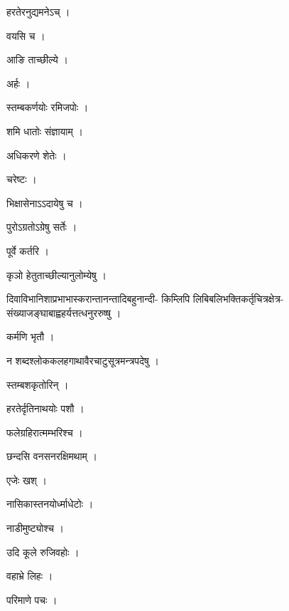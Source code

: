 \documentclass[10pt, openany]{book}
\begin{document}
\noindent हरतेरनुद्यमनेऽच् ।

\noindent वयसि च ।

\noindent आङि ताच्छील्ये ।

\noindent अर्हः ।

\noindent स्तम्बकर्णयोः रमिजपोः ।

\noindent शमि धातोः संज्ञायाम् ।

\noindent अधिकरणे शेतेः ।

\noindent चरेष्टः ।

\noindent भिक्षासेनाऽऽदायेषु च ।

\noindent पुरोऽग्रतोऽग्रेषु सर्तेः ।

\noindent पूर्वे कर्तरि ।

\noindent कृञो हेतुताच्छील्यानुलोम्येषु ।

\noindent दिवाविभानिशाप्रभाभास्करान्तानन्तादिबहुनान्दी- किम्लिपि लिबिबलिभक्तिकर्तृचित्रक्षेत्र- संख्याजङ्घाबाह्वहर्यत्तत्धनुररुष्षु ।

\noindent कर्मणि भृतौ ।

\noindent न शब्दश्लोककलहगाथावैरचाटुसूत्रमन्त्रपदेषु ।

\noindent स्तम्बशकृतोरिन् ।

\noindent हरतेर्दृतिनाथयोः पशौ ।

\noindent फलेग्रहिरात्मम्भरिश्च ।

\noindent छन्दसि वनसनरक्षिमथाम् ।

\noindent एजेः खश् ।

\noindent नासिकास्तनयोर्ध्माधेटोः ।

\noindent नाडीमुष्ट्योश्च ।

\noindent उदि कूले रुजिवहोः ।

\noindent वहाभ्रे लिहः ।

\noindent परिमाणे पचः ।
\end{document}
